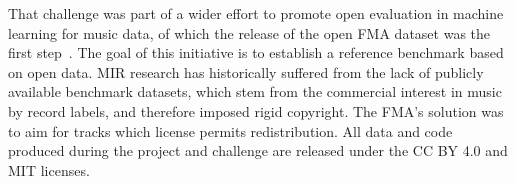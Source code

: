 \documentclass[sigconf]{acmart}
\begin{document}
That challenge was part of a wider effort to promote open evaluation in machine learning for music data, of which the release of the open FMA dataset was the first step~\cite{fma_dataset}. The goal of this initiative is to establish a reference benchmark based on open data. MIR research has historically suffered from the lack of publicly available benchmark datasets, which stem from the commercial interest in music by record labels, and therefore imposed rigid copyright. The FMA's solution was to aim for tracks which license permits redistribution. All data and code produced during the project and challenge are released under the CC BY 4.0 and MIT licenses.




\end{document}
